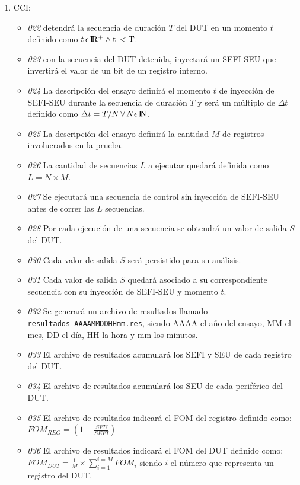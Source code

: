 \begin{enumerate}
	\item CCI:
		\begin{itemize}
			\item \emph{022} detendrá la secuencia de duración $ T $ del DUT en un momento $ t $ definido como $ t \, \epsilon \, \rm I\!R^+ \wedge t \, < T$.
			\item \emph{023} con la secuencia del DUT detenida, inyectará un SEFI-SEU que invertirá el valor de un bit de un registro interno.
			\item \emph{024} La descripción del ensayo definirá el momento $ t $ de inyección de SEFI-SEU durante la secuencia de duración $ T $ y será un múltiplo de $\Delta t$ definido como $ \Delta t=T/N \, \forall \, N \epsilon \, \rm I\!N $.
			\item \emph{025} La descripción del ensayo definirá la cantidad $ M $ de registros involucrados en la prueba.
			\item \emph{026} La cantidad de secuencias $ L $ a ejecutar quedará definida como \\$ L = N \times M $.
			\item \emph{027} Se ejecutará una secuencia de control sin inyección de SEFI-SEU antes de correr las $ L $ secuencias.
			\item \emph{028} Por cada ejecución de una secuencia se obtendrá un valor de salida $ S $ del DUT.
			\item \emph{030} Cada valor de salida $ S $ será persistido para su análisis.
			\item \emph{031} Cada valor de salida $ S $ quedará asociado a su correspondiente secuencia con su inyección de SEFI-SEU y momento $ t $.
			\item \emph{032} Se generará un archivo de resultados llamado\\ \texttt{resultados-AAAAMMDDHHmm.res}, siendo AAAA el año del ensayo, MM el mes, DD el día, HH la hora y mm los minutos.
			\item \emph{033} El archivo de resultados acumulará los SEFI y SEU de cada registro del DUT.
			\item \emph{034} El archivo de resultados acumulará los SEU de cada periférico del DUT.
			\item \emph{035} El archivo de resultados indicará el FOM del registro definido como:
			$ FOM_{REG} = (1 - \frac{SEU}{SEFI}) $
			\item \emph{036} El archivo de resultados indicará el FOM del DUT definido como:
			$ FOM_{DUT} = \frac{1}{M} \times \sum_{i = 1}^{i = M}FOM_{i} $ siendo $ i $ el número que representa un registro del DUT.

\end{itemize}
\end{enumerate}
